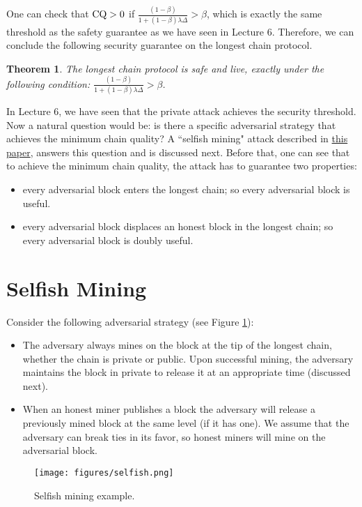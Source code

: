 \documentclass{article}
\newtheorem{theorem}{Theorem}
\begin{document}
One can check that ${\rm CQ > 0}$ if $\frac{(1-\beta)}{1+(1-\beta)\lambda\Delta} > \beta$, which is exactly the same threshold as the safety guarantee as we have seen in Lecture 6. Therefore, we can conclude the following security guarantee on the longest chain protocol.
\begin{theorem}
The longest chain protocol is safe and live, exactly under the following condition:  $\frac{(1-\beta)}{1+(1-\beta)\lambda\Delta} > \beta$.
\end{theorem}

In Lecture 6, we have seen that the private attack achieves the security threshold. Now a natural question would be: is there a specific adversarial strategy that achieves the minimum chain quality? A ``selfish mining" attack  described in \href{https://arxiv.org/abs/1311.0243?source=post_page---------------------------}{this paper}, answers this question and is discussed next. Before that, one can see that to achieve the minimum chain quality, the attack has to guarantee two properties: 
\begin{itemize}
    \item  every adversarial block enters the longest chain; so every adversarial block is useful.
    \item every adversarial block displaces an honest block in the longest chain; so every adversarial block is doubly useful. 
\end{itemize}


\section*{Selfish Mining}
Consider the following adversarial strategy (see Figure \ref{fig:selfish}):
\begin{itemize}
    \item The adversary always mines on the block at the tip of the longest chain, whether the chain is  private or public. Upon successful mining, the adversary maintains  the block in private to  release it at an appropriate time (discussed next). 
    \item When an honest miner publishes a block the adversary will release a previously mined block at the same level (if it has one). We assume that the adversary can break ties in its favor, so honest miners will mine on the adversarial block.
\end{itemize}


\begin{figure}
    \centering
    \texttt{[image: figures/selfish.png]}
    \caption{Selfish mining example.}
    \label{fig:selfish}
\end{figure}
\end{document}
